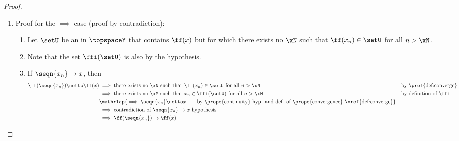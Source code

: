 \begin{proof}
\begin{enumerate}
  \item Proof for the $\implies$ case (proof by contradiction):
    \begin{enumerate}
      \item Let $\setU$ be an  in $\topspaceY$ that contains $\ff(x)$ but for which 
            there exists no $\xN$ such that $\ff(x_n)\in\setU$ for all $n>\xN$.
      \item Note that the set $\ffi(\setU)$ is also  by the  hypothesis.
      \item If $\seqn{x_n}\to x$, then
      \begin{align*}
        \ff(\seqn{x_n})\notto \ff(x)
          &\implies \text{there exists no $\xN$ such that $\ff(x_n)\in\setU$ for all $n>\xN$}
          &&\text{by \pref{def:converge}}
        \\&\implies \text{there exists no $\xM$ such that $x_n\in\ffi(\setU)$ for all $n>\xM$}
          &&\text{by definition of $\ffi$}
        \\&\mathrlap{\implies \seqn{x_n}\notto x 
          \qquad\text{by \prope{continuity} hyp. and def. of \prope{convergence} \xref{def:converge}}}
        \\&\implies \text{contradiction of $\seqn{x_n}\to x$ hypothesis}
        \\&\implies \ff(\seqn{x_n})\to \ff(x)
      \end{align*}
    \end{enumerate}


\end{enumerate}
\end{proof}

